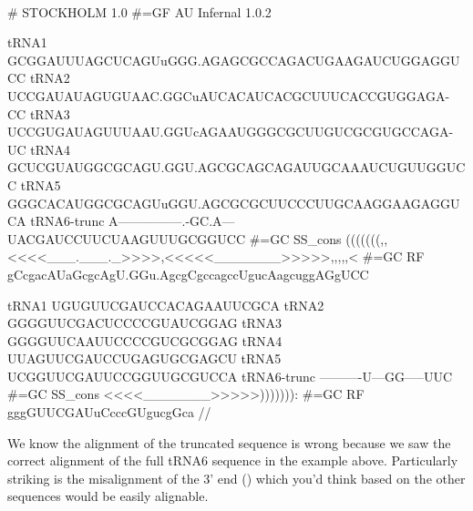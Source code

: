 \\

{\samepage
\begin{sreoutput}
# STOCKHOLM 1.0
#=GF AU Infernal 1.0.2

tRNA1        GCGGAUUUAGCUCAGUuGGG.AGAGCGCCAGACUGAAGAUCUGGAGGUCC
tRNA2        UCCGAUAUAGUGUAAC.GGCuAUCACAUCACGCUUUCACCGUGGAGA-CC
tRNA3        UCCGUGAUAGUUUAAU.GGUcAGAAUGGGCGCUUGUCGCGUGCCAGA-UC
tRNA4        GCUCGUAUGGCGCAGU.GGU.AGCGCAGCAGAUUGCAAAUCUGUUGGUCC
tRNA5        GGGCACAUGGCGCAGUuGGU.AGCGCGCUUCCCUUGCAAGGAAGAGGUCA
tRNA6-trunc  A---------------.-GC.A---UACGAUCCUUCUAAGUUUGCGGUCC
#=GC SS_cons (((((((,,<<<<___.___._>>>>,<<<<<_______>>>>>,,,,,<
#=GC RF      gCcgacAUaGcgcAgU.GGu.AgcgCgccagccUgucAagcuggAGgUCC

tRNA1        UGUGUUCGAUCCACAGAAUUCGCA
tRNA2        GGGGUUCGACUCCCCGUAUCGGAG
tRNA3        GGGGUUCAAUUCCCCGUCGCGGAG
tRNA4        UUAGUUCGAUCCUGAGUGCGAGCU
tRNA5        UCGGUUCGAUUCCGGUUGCGUCCA
tRNA6-trunc  ----------U---GG-----UUC
#=GC SS_cons <<<<_______>>>>>))))))):
#=GC RF      gggGUUCGAUuCcccGUgucgGca
//
\end{sreoutput}
}

We know the alignment of the truncated sequence
 is wrong because we saw the correct alignment
of the full tRNA6 sequence in the example above. Particularly striking
is the misalignment of the 3' end () which you'd think
based on the other sequences would be easily alignable.


